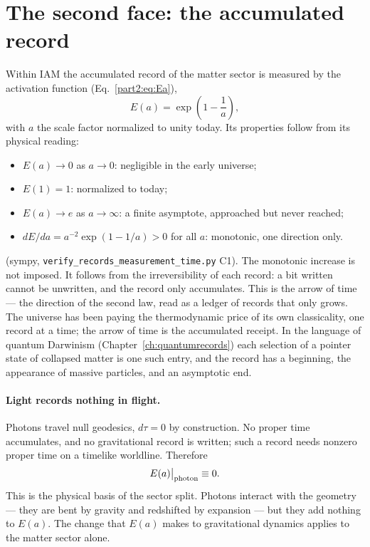 \section{The second face: the accumulated record}\label{sec:time_record}
Within IAM the accumulated record of the matter sector is measured by the activation function (Eq.~\ref{part2:eq:Ea}),
\begin{equation}
E(a)=\exp\!\left(1-\frac1a\right),\label{eq:time_Ea}
\end{equation}
with $a$ the scale factor normalized to unity today. Its properties follow from its physical reading:
\begin{itemize}
\item $E(a)\to0$ as $a\to0$: negligible in the early universe;
\item $E(1)=1$: normalized to today;
\item $E(a)\to e$ as $a\to\infty$: a finite asymptote, approached but never reached;
\item $dE/da=a^{-2}\exp(1-1/a)>0$ for all $a$: monotonic, one direction only.
\end{itemize}
\derived{} (sympy, \texttt{verify\_records\_measurement\_time.py} C1). The monotonic increase is not imposed. It follows from the irreversibility of each record: a bit written cannot be unwritten,
and the record only accumulates. This is the arrow of time --- the direction of the second law, read as a ledger of records that only grows.
\interp{} The universe has been paying the thermodynamic price of its own classicality, one record at a time; the arrow of time is the accumulated
receipt. In the language of quantum Darwinism (Chapter~\ref{ch:quantumrecords}) each selection of a pointer state of collapsed matter is one such
entry, and the record has a beginning, the appearance of massive particles, and an asymptotic end. \interp

\paragraph{Light records nothing in flight.} Photons travel null geodesics, $d\tau=0$ by construction. No proper time accumulates, and no gravitational
record is written; such a record needs nonzero proper time on a timelike worldline. Therefore
\begin{equation}
E(a)\big|_{\rm photon}\equiv0 .\label{eq:time_Ephoton}
\end{equation}
\derived{} This is the physical basis of the sector split. Photons interact with the geometry --- they are bent by gravity and redshifted by
expansion --- but they add nothing to $E(a)$. The change that $E(a)$ makes to gravitational dynamics applies to the matter sector alone.

